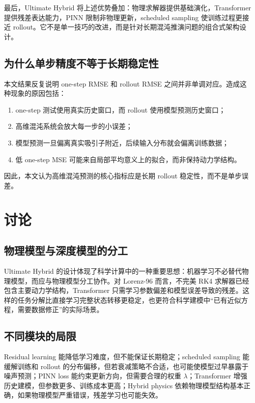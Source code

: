 \documentclass[UTF8,a4paper,12pt]{ctexart}
\begin{document}
最后，Ultimate Hybrid 将上述优势叠加：物理求解器提供基础演化，Transformer 提供残差表达能力，PINN 限制非物理更新，scheduled sampling 使训练过程更接近 rollout。它不是单一技巧的改进，而是针对长期混沌推演问题的组合式架构设计。

\subsection{为什么单步精度不等于长期稳定性}

本文结果反复说明 one-step RMSE 和 rollout RMSE 之间并非单调对应。造成这种现象的原因包括：
\begin{enumerate}
    \item one-step 测试使用真实历史窗口，而 rollout 使用模型预测历史窗口；
    \item 高维混沌系统会放大每一步的小误差；
    \item 模型预测一旦偏离真实吸引子附近，后续输入分布就会偏离训练数据；
    \item 低 one-step MSE 可能来自局部平均意义上的拟合，而非保持动力学结构。
\end{enumerate}
因此，本文认为高维混沌预测的核心指标应是长期 rollout 稳定性，而不是单步误差。

\section{讨论}

\subsection{物理模型与深度模型的分工}

Ultimate Hybrid 的设计体现了科学计算中的一种重要思想：机器学习不必替代物理模型，而应与物理模型分工协作。对 Lorenz-96 而言，不完美 RK4 求解器已经包含主要动力学结构，Transformer 只需学习参数偏差和模型误差导致的残差。这样的任务分解比直接学习完整状态转移更稳定，也更符合科学建模中“已有近似方程，需要数据修正”的实际场景。

\subsection{不同模块的局限}

Residual learning 能降低学习难度，但不能保证长期稳定；scheduled sampling 能缓解训练和 rollout 的分布偏移，但若衰减策略不合适，也可能使模型过早暴露于噪声预测；PINN loss 能约束更新方向，但需要合理的权重 $\lambda$；Transformer 增强历史建模，但参数更多、训练成本更高；Hybrid physics 依赖物理模型结构基本正确，如果物理模型严重错误，残差学习也可能失效。
\end{document}
